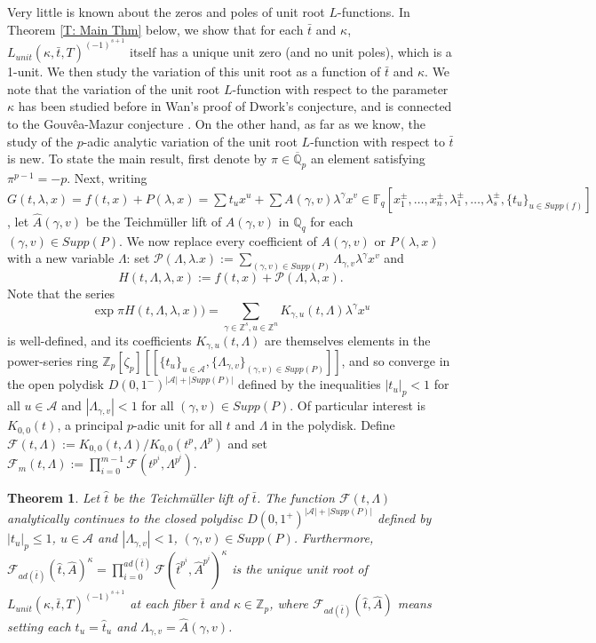\documentclass{article}
\newtheorem{theorem}{Theorem}[section]
\theoremstyle{remark}
\def\bb #1{ {\mathbb #1} }
\def\c #1{ {\mathcal #1} }
\begin{document}
Very little is known about the zeros and poles of unit root $L$-functions. In Theorem \ref{T:  Main Thm} below, we show that for each $\bar t$ and $\kappa$, $L_{unit}(\kappa, \bar t, T)^{(-1)^{s+1}}$ itself has a unique unit zero (and no unit poles), which is a 1-unit. We then study the variation of this unit root as a function of $\bar t$ and $\kappa$. We note that the variation of the unit root $L$-function with respect to the parameter $\kappa$ has been studied before in Wan's proof of Dwork's conjecture, and is connected to the Gouv\^ea-Mazur conjecture \cite{MR1122070}. On the other hand, as far as we know, the study of the $p$-adic analytic variation of the unit root $L$-function with respect to $\bar t$ is new. To state the main result, first denote by $\pi \in \overline{\bb Q}_p$ an element satisfying $\pi^{p-1} = -p$. Next, writing $G(t, \lambda, x) = f(t, x) + P(\lambda, x) = \sum t_u x^u + \sum A(\gamma, v) \lambda^\gamma x^v \in \bb F_q[x_1^\pm, \ldots, x_n^\pm, \lambda_1^\pm, \ldots, \lambda_s^\pm, \{ t_u \}_{u \in Supp(f)}]$, let  $\hat A(\gamma, v)$ be the Teichm\"uller lift of $A(\gamma, v)$ in $\bb Q_q$ for each $(\gamma, v) \in Supp(P)$. We now replace every coefficient of $A(\gamma, v)$ or $P(\lambda, x)$ with a new variable $\Lambda$: set $\c P(\Lambda, \lambda. x) := \sum_{(\gamma, v) \in Supp(P)} \Lambda_{\gamma, v} \lambda^\gamma x^v$ and
\[
H(t, \Lambda, \lambda, x) := f(t, x)  +  \c P(\Lambda, \lambda, x).
\]
Note that the series 
\[
\exp \pi H(t, \Lambda, \lambda, x) ) = \sum_{\gamma \in \bb Z^s, u \in \bb Z^n} K_{\gamma, u}(t, \Lambda) \lambda^{\gamma} x^{u}
\]
is well-defined, and its coefficients $K_{\gamma, u}(t, \Lambda)$ are themselves elements in the power-series ring  $\bb Z_p[\zeta_p][[\{ t_u \}_{u \in \c A}, \{ \Lambda_{\gamma, v} \}_{(\gamma, v) \in Supp(P)}]]$, and so converge in the open polydisk $D(0,1^-)^{|\c A| + |Supp(P)|}$ defined by the inequalities $|t_u|_p < 1$ for all $u \in \c A$ and $| \Lambda_{\gamma, v} | < 1$ for all $(\gamma, v) \in Supp(P)$. Of particular interest is $K_{0,0}(t)$, a principal $p$-adic unit for all $t$ and $\Lambda$ in the polydisk. Define $\c F(t, \Lambda) := K_{0,0}(t, \Lambda) / K_{0,0}(t^p, \Lambda^p)$ and set $\c F_m(t, \Lambda) := \prod_{i=0}^{m-1}  \c F(t^{p^i}, \Lambda^{p^i})$.

\begin{theorem}\label{T: Main Thm}
Let $\hat t$ be the Teichm\"uller lift of $\bar t$. The function $\c F(t, \Lambda)$ analytically continues to the closed polydisc $D(0,1^+)^{|\c A| + |Supp(P)|}$ defined by  $|t_u|_p \leq 1$, $u \in \c A$ and $|\Lambda_{\gamma, v}| < 1$, $(\gamma, v) \in Supp(P)$. Furthermore, $\c F_{a d(\bar t)}(\hat t, \hat A)^\kappa = \prod_{i=0}^{a d(\bar t)} \c F(\hat t^{p^i}, \hat A^{p^i})^\kappa$ is the unique unit root of $L_{unit}(\kappa, \bar t, T) ^{(-1)^{s+1}}$ at each fiber $\bar t$ and $\kappa \in \bb Z_p$, where $\c F_{a d(\bar t)}(\hat t, \hat A)$ means setting each $t_u = \hat t_u$ and $\Lambda_{\gamma, v} = \hat A(\gamma, v)$.
\end{theorem}
\end{document}
